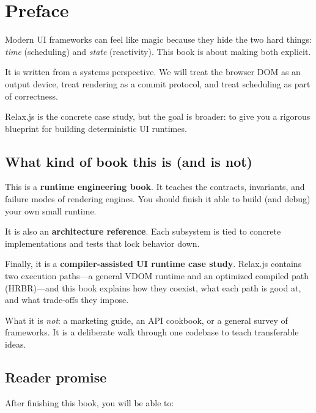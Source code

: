 \chapter*{Preface}

Modern UI frameworks can feel like magic because they hide the two hard things:
\emph{time} (scheduling) and \emph{state} (reactivity).
This book is about making both explicit.

It is written from a systems perspective.
We will treat the browser DOM as an output device, treat rendering as a commit protocol, and treat scheduling as part of correctness.

Relax.js is the concrete case study, but the goal is broader:
to give you a rigorous blueprint for building deterministic UI runtimes.

\section*{What kind of book this is (and is not)}

This is a \textbf{runtime engineering book}.
It teaches the contracts, invariants, and failure modes of rendering engines.
You should finish it able to build (and debug) your own small runtime.

It is also an \textbf{architecture reference}.
Each subsystem is tied to concrete implementations and tests that lock behavior down.

Finally, it is a \textbf{compiler-assisted UI runtime case study}.
Relax.js contains two execution paths---a general VDOM runtime and an optimized compiled path (HRBR)---and this book explains how they coexist,
what each path is good at, and what trade-offs they impose.

What it is \emph{not}: a marketing guide, an API cookbook, or a general survey of frameworks.
It is a deliberate walk through one codebase to teach transferable ideas.

\section*{Reader promise}

After finishing this book, you will be able to:

